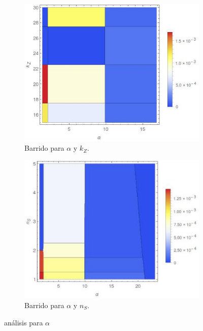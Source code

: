 \documentclass[12pt]{article}
\begin{document}
\begin{figure}[H]
  \begin{subfigure}[b]{0.5\textwidth}
	\centering
  	\includegraphics[width=\textwidth]{alpha-kz.jpeg}
  	\caption{\label{fig:alpha-kz} Barrido para $\alpha$ y $k_Z$.}
  \end{subfigure}  
  \begin{subfigure}[b]{0.5\textwidth}
  	\centering
  	\includegraphics[width=\textwidth]{alpha-nS.jpeg}
  	\caption{\label{fig:alpha-nS} Barrido para $\alpha$ y $n_S$.}
  \end{subfigure}  
\caption{\label{fig:alpha} an\'alisis para $\alpha$} 
\end{figure}
\end{document}
